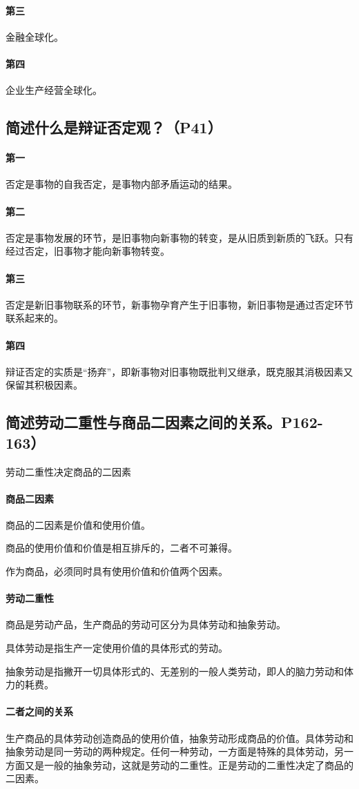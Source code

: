 \documentclass[UTF8]{ctexart}
\begin{document}
			\paragraph{第三}
				金融全球化。
			\paragraph{第四}
				企业生产经营全球化。
		\subsection{简述什么是辩证否定观？（P41）}
			\paragraph{第一}
				否定是事物的自我否定，是事物内部矛盾运动的结果。
			\paragraph{第二}
				否定是事物发展的环节，是旧事物向新事物的转变，是从旧质到新质的飞跃。只有经过否定，旧事物才能向新事物转变。
			\paragraph{第三}
				否定是新旧事物联系的环节，新事物孕育产生于旧事物，新旧事物是通过否定环节联系起来的。
			\paragraph{第四}
				辩证否定的实质是“扬弃”，即新事物对旧事物既批判又继承，既克服其消极因素又保留其积极因素。
		\subsection{简述劳动二重性与商品二因素之间的关系。P162-163）}
			劳动二重性决定商品的二因素\par
			\paragraph{商品二因素}
				商品的二因素是价值和使用价值。\par
				商品的使用价值和价值是相互排斥的，二者不可兼得。\par
				作为商品，必须同时具有使用价值和价值两个因素。\par
			\paragraph{劳动二重性}
				商品是劳动产品，生产商品的劳动可区分为具体劳动和抽象劳动。\par
				具体劳动是指生产一定使用价值的具体形式的劳动。\par
				抽象劳动是指撇开一切具体形式的、无差别的一般人类劳动，即人的脑力劳动和体力的耗费。\par
			\paragraph{二者之间的关系}
				生产商品的具体劳动创造商品的使用价值，抽象劳动形成商品的价值。具体劳动和抽象劳动是同一劳动的两种规定。任何一种劳动，一方面是特殊的具体劳动，另一方面又是一般的抽象劳动，这就是劳动的二重性。正是劳动的二重性决定了商品的二因素。
\end{document}

